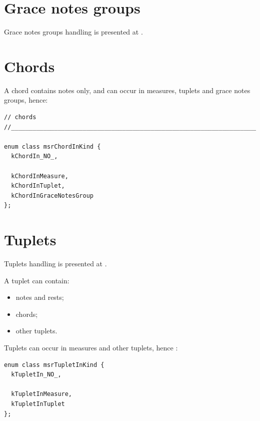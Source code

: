 \section{Grace notes groups}\label{Grace notes groups}

Grace notes groups handling is presented at .


\section{Chords}\label{Chords}

A chord contains notes only, and can occur in measures, tuplets and grace notes groups, hence:
\begin{lstlisting}[language=CPlusPlus]
// chords
//______________________________________________________________________________

enum class msrChordInKind {
  kChordIn_NO_,

  kChordInMeasure,
  kChordInTuplet,
  kChordInGraceNotesGroup
};
\end{lstlisting}


\section{Tuplets}\label{Tuplets}

Tuplets handling is presented at .

A tuplet can contain:
\begin{itemize}
\item notes and rests;
\item chords;
\item other tuplets.
\end{itemize}

Tuplets can occur in measures and other tuplets, hence :
\begin{lstlisting}[language=CPlusPlus]
enum class msrTupletInKind {
  kTupletIn_NO_,

  kTupletInMeasure,
  kTupletInTuplet
};
\end{lstlisting}


